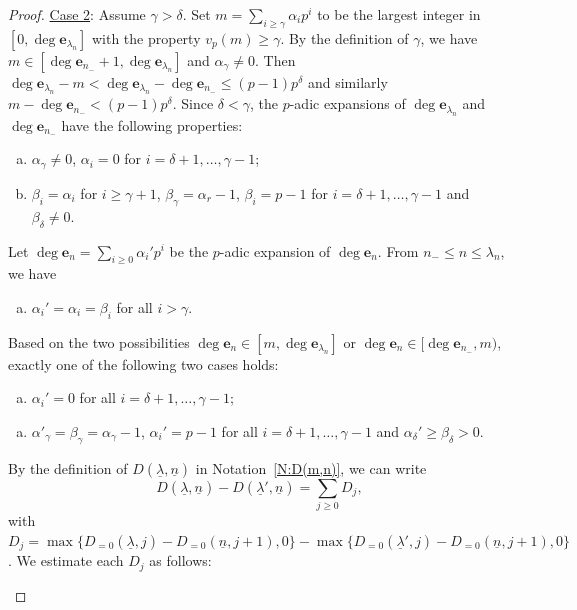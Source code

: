 \documentclass[12pt]{amsart}
\theoremstyle{definition}
\numberwithin{equation}{subsection}
\def\bfe{\mathbf{e}}
\begin{document}
\begin{proof}
\underline{Case 2}: Assume $\gamma>\delta$. Set $m=\sum\limits_{i\geq \gamma}\alpha_ip^i$ to be the largest integer in $[0,\deg\bfe_{\lambda_n}]$ with the property $v_p(m)\geq \gamma$. By the definition of $\gamma$, we have $m\in [\deg \bfe_{n_-}+1,\deg \bfe_{\lambda_n}]$ and $\alpha_\gamma\neq 0$. Then $\deg\bfe_{\lambda_n}-m<\deg\bfe_{\lambda_n}-\deg\bfe_{n_-}\leq (p-1)p^\delta$ and similarly $m-\deg \bfe_{n_-}<(p-1)p^\delta$. Since $\delta<\gamma$, the $p$-adic expansions of $\deg \bfe_{\lambda_n}$ and $\deg \bfe_{n_-}$ have the following properties:
\begin{enumerate}[(a)]
\item $\alpha_\gamma\neq 0$, $\alpha_i=0$ for $i=\delta+1,\dots, \gamma-1$;
\item $\beta_i=\alpha_i$ for $i\geq \gamma+1$, $\beta_\gamma=\alpha_r-1$, $\beta_i=p-1$ for $i=\delta+1,\dots, \gamma-1$ and $\beta_\delta\neq 0$.
		\end{enumerate}
		Let $\deg \bfe_n=\sum\limits_{i\geq 0}\alpha_i'p^i$ be the $p$-adic expansion of $\deg\bfe_n$. From $n_-\leq n\leq \lambda_n$, we have
		\begin{enumerate}[(c)]
			\item $\alpha_i'=\alpha_i=\beta_i$ for all $i>\gamma$.
		\end{enumerate}
		Based on the two possibilities $\deg\bfe_n\in [m,\deg \bfe_{\lambda_n}]$ or $\deg \bfe_n\in [\deg \bfe_{n_-}, m)$, exactly one of the following two cases holds:
		\begin{enumerate}[(d)]
			\item $\alpha_i'=0$ for all $i=\delta+1,\dots, \gamma-1$;
		\end{enumerate}
		\begin{enumerate}[(e)]
			\item $\alpha'_\gamma=\beta_\gamma=\alpha_\gamma-1$, $\alpha_i'=p-1$ for all $i=\delta+1,\dots, \gamma-1$ and $\alpha_\delta'\geq \beta_\delta>0$.
		\end{enumerate}
		By the definition of $D(\underline \lambda, \underline n)$ in Notation~\ref{N:D(m,n)}, we can write 
		\begin{equation}
			\label{E:D(lambda,n)-D(lambda',n)}
		D(\underline \lambda, \underline n)-D(\underline \lambda', \underline n)=\sum_{j\geq 0}D_j, 
		\end{equation}
		with $D_j=\max\{D_{=0}(\underline \lambda,j )-D_{=0}(\underline n,j+1), 0 \}- \max\{D_{=0}(\underline \lambda',j )-D_{=0}(\underline n,j+1), 0 \}$. We estimate each $D_j$ as follows:
		\begin{enumerate}[(i)]

\end{enumerate}
\end{proof}
\end{document}
